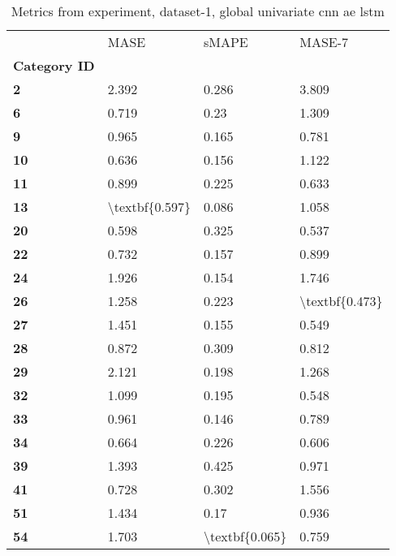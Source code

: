 \begin{table}[h]
\centering
\caption{Metrics from experiment, dataset-1, global univariate cnn ae lstm}
\label{table:global-univariate-cnn-ae-lstm-dataset-1}
\begin{tabular}{llll}
\toprule
{} &            MASE &           sMAPE &          MASE-7 \\
\textbf{Category ID} &                 &                 &                 \\
\midrule
\textbf{2          } &           2.392 &           0.286 &           3.809 \\
\textbf{6          } &           0.719 &            0.23 &           1.309 \\
\textbf{9          } &           0.965 &           0.165 &           0.781 \\
\textbf{10         } &           0.636 &           0.156 &           1.122 \\
\textbf{11         } &           0.899 &           0.225 &           0.633 \\
\textbf{13         } &  \textbackslash textbf\{0.597\} &           0.086 &           1.058 \\
\textbf{20         } &           0.598 &           0.325 &           0.537 \\
\textbf{22         } &           0.732 &           0.157 &           0.899 \\
\textbf{24         } &           1.926 &           0.154 &           1.746 \\
\textbf{26         } &           1.258 &           0.223 &  \textbackslash textbf\{0.473\} \\
\textbf{27         } &           1.451 &           0.155 &           0.549 \\
\textbf{28         } &           0.872 &           0.309 &           0.812 \\
\textbf{29         } &           2.121 &           0.198 &           1.268 \\
\textbf{32         } &           1.099 &           0.195 &           0.548 \\
\textbf{33         } &           0.961 &           0.146 &           0.789 \\
\textbf{34         } &           0.664 &           0.226 &           0.606 \\
\textbf{39         } &           1.393 &           0.425 &           0.971 \\
\textbf{41         } &           0.728 &           0.302 &           1.556 \\
\textbf{51         } &           1.434 &            0.17 &           0.936 \\
\textbf{54         } &           1.703 &  \textbackslash textbf\{0.065\} &           0.759 \\
\bottomrule
\end{tabular}
\end{table}
